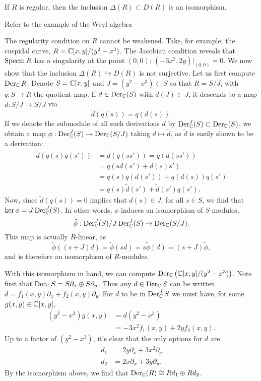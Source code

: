 \begin{theorem}
    If $R$ is regular, then the inclusion $\Delta(R)\subset D(R)$ is an isomorphism.
    \label{thm:derivationiso}
\end{theorem}

Refer to the example of the Weyl algebra %

\begin{example}
    The regularity condition on $R$ cannot be weakened. Take, for example, the cuspidal curve,
    $R=\mathbb{C}[x,y]/(y^2-x^3)$. The Jacobian condition reveals that $\operatorname{Specm} R$ has a
    singularity at the point $(0,0)$: $(-3x^2, 2y)|_{(0,0)}=0$. We now show that the inclusion
    $\Delta(R)\hookrightarrow D(R)$ is not surjective. Let us first compute $\operatorname{Der}_{\mathbb{C}} R$.
    Denote $S=\mathbb{C}[x,y]$ and $J=(y^2-x^3)\subset S$ so that $R=S/J$, with $q:S\to R$ the quotient map.
    If $d\in\operatorname{Der}_{\mathbb{C}}(S)$ with $d(J)\subset J$, it descends to a map $\tilde d:S/J\to S/J$ via
    \[\tilde d(q(s))=q(d(s)).\] If we denote the submodule of all such derivations $d$ by
    $\operatorname{Der}^J_{\mathbb{C}}(S)\subset\operatorname{Der}_{\mathbb{C}}(S)$, we obtain a map $\phi:\operatorname{Der}^J_{\mathbb{C}}(S)\to\operatorname{Der}_{\mathbb{C}}(S/J)$ taking
    $d\mapsto \tilde d$, as $\tilde d$ is easily shown to be a derivation:
    \begin{align*}
        \tilde d(q(s)q(s')) &= \tilde d\left( q(ss') \right)=q(d(ss'))\\
        &= q(sd(s')+d(s)s')\\
        &= q(s)q(d(s')) + q(d(s))q(s')\\
        &= q(s)\tilde d(s') + \tilde d(s')q(s').
    \end{align*}
    Now, since $\tilde d(q(s))=0$ implies that $d(s)\in J$, for all $s\in S$, we find that
    $\ker\phi = J\operatorname{Der}^J_{\mathbb{C}}(S)$. In other words, $\phi$ induces an isomorphism of $S$-modules,
    \[\tilde \phi:\operatorname{Der}^J_{\mathbb{C}}(S)/J\operatorname{Der}_{\mathbb{C}}^J(S)\to\operatorname{Der}_{\mathbb{C}}(S/J).\]
    This map is actually $R$-linear, as 
    \[\tilde\phi( (s+J)d)=\tilde\phi(sd)=s\tilde\phi(d)=(s+J)\tilde\phi,\]
    and is therefore an isomorphism of $R$-modules.

    With this isomorphism in hand, we can compute $\operatorname{Der}_{\mathbb{C}}\left( \mathbb{C}[x,y]/(y^2-x^3) \right)$.
    Note first that $\operatorname{Der}_{\mathbb{C}} S=S\partial_x\oplus S\partial_y$.
    Thus any $d\in\operatorname{Der}_{\mathbb{C}} S$ can
    be written $d=f_1(x,y)\partial_x+f_2(x,y)\partial_y$. For $d$ to be in $\operatorname{Der}_{\mathbb{C}}^JS$
    we must have, for some $g(x,y)\in\mathbb{C}[x,y]$,
    \begin{align*}
        (y^2-x^3)g(x,y) &= d(y^2-x^3)\\
        &= -3x^2f_1(x,y)+2yf_2(x,y).
    \end{align*}
    Up to a factor of $(y^2-x^3)$, it's clear that the only options for $d$ are
    \begin{align*}
        d_1 &= 2y\partial_x + 3x^2\partial_y\\
        d_2 &= 2x\partial_x+3y\partial_y.
    \end{align*}
    By the isomorphism above, we find that $\operatorname{Der}_{\mathbb{C}}(R)\cong Rd_1\oplus Rd_2$.


\end{example}
